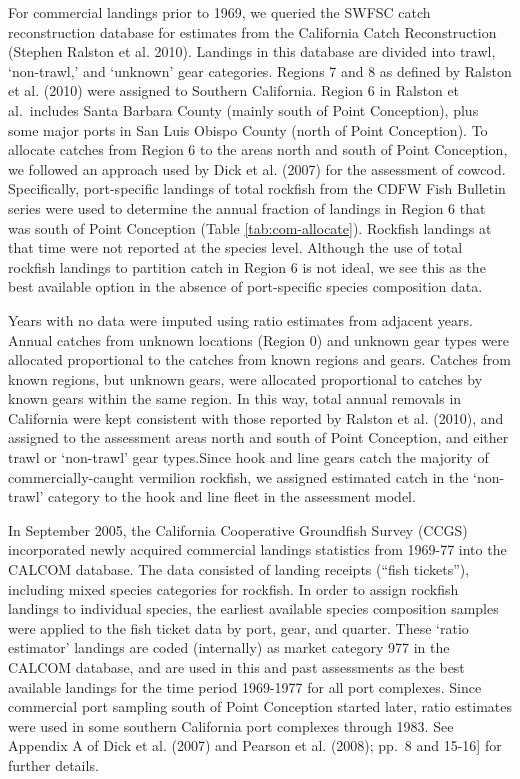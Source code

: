 \documentclass[
  english,
  a4paper,
]{article}
\begin{document}
For commercial landings prior to 1969, we queried the SWFSC catch reconstruction
database for estimates from the California Catch Reconstruction (Stephen Ralston et al. 2010).
Landings in this database are divided into trawl, `non-trawl,' and `unknown' gear
categories. Regions 7 and 8 as defined by Ralston et al. (2010) were
assigned to Southern California. Region 6 in Ralston et al.~includes Santa
Barbara County (mainly south of Point Conception), plus some major ports in San
Luis Obispo County (north of Point Conception). To allocate catches from Region
6 to the areas north and south of Point Conception, we followed an approach used
by Dick et al. (2007) for the assessment of cowcod. Specifically,
port-specific landings of total rockfish from the CDFW Fish Bulletin series were
used to determine the annual fraction of landings in Region 6 that was south of
Point Conception (Table \ref{tab:com-allocate}). Rockfish landings at that time were not reported
at the species level. Although the use of total rockfish landings to partition
catch in Region 6 is not ideal, we see this as the best available option in the
absence of port-specific species composition data.

Years with no data were imputed
using ratio estimates from adjacent years. Annual catches from unknown locations
(Region 0) and unknown gear types were allocated proportional to the catches from
known regions and gears. Catches from known regions, but unknown gears, were
allocated proportional to catches by known gears within the same region. In this way,
total annual removals in California were kept consistent with those reported by
Ralston et al. (2010), and assigned to the assessment areas north and
south of Point Conception, and either trawl or `non-trawl' gear types.Since hook and line gears catch the majority of
commercially-caught vermilion rockfish, we assigned estimated catch in the
`non-trawl' category to the hook and line fleet in the assessment model.

In September 2005, the California Cooperative Groundfish Survey (CCGS)
incorporated newly acquired commercial landings statistics from 1969-77 into
the CALCOM database. The data consisted of landing receipts (``fish tickets''),
including mixed species categories for rockfish. In order to assign rockfish
landings to individual species, the earliest available species composition
samples were applied to the fish ticket data by port, gear, and quarter. These
`ratio estimator' landings are coded (internally) as market category 977 in the
CALCOM database, and are used in this and past assessments as the best available
landings for the time period 1969-1977 for all port complexes. Since commercial
port sampling south of Point Conception started later, ratio estimates were used
in some southern California port complexes through 1983. See Appendix A of Dick
et al. (2007) and Pearson et al. (2008); pp.~8 and 15-16{]} for
further details.
\end{document}
